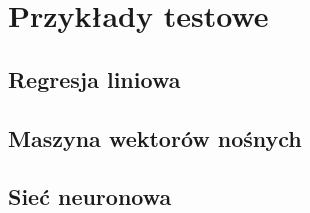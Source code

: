 \section{Przykłady testowe}

\subsection{Regresja liniowa}
\subsection{Maszyna wektorów nośnych}
\subsection{Sieć neuronowa}